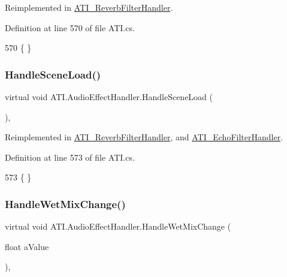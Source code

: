 Reimplemented in \hyperlink{class_a_t_i___reverb_filter_handler_a52fe6f9775f8e51296580f7a96b47bdb}{A\+T\+I\+\_\+\+Reverb\+Filter\+Handler}.



Definition at line 570 of file A\+T\+I.\+cs.


\begin{DoxyCode}
570 \{ \}
\end{DoxyCode}
\mbox{\label{class_a_t_i_1_1_audio_effect_handler_aa038c62089df16a01d2749986649db11}} 
\subsubsection{\texorpdfstring{Handle\+Scene\+Load()}{HandleSceneLoad()}}
{\footnotesize\ttfamily virtual void A\+T\+I.\+Audio\+Effect\+Handler.\+Handle\+Scene\+Load (\begin{DoxyParamCaption}{ }\end{DoxyParamCaption})\hspace{0.3cm}{\ttfamily [protected]}, {\ttfamily [virtual]}}



Reimplemented in \hyperlink{class_a_t_i___reverb_filter_handler_a084dca3566139f350b0372d3ee85af84}{A\+T\+I\+\_\+\+Reverb\+Filter\+Handler}, and \hyperlink{class_a_t_i___echo_filter_handler_aef6df1fd85fb153d232191f1bd4de5f3}{A\+T\+I\+\_\+\+Echo\+Filter\+Handler}.



Definition at line 573 of file A\+T\+I.\+cs.


\begin{DoxyCode}
573 \{ \}
\end{DoxyCode}
\mbox{\label{class_a_t_i_1_1_audio_effect_handler_a630d6f0e674c531ad0c138181609a895}} 
\subsubsection{\texorpdfstring{Handle\+Wet\+Mix\+Change()}{HandleWetMixChange()}}
{\footnotesize\ttfamily virtual void A\+T\+I.\+Audio\+Effect\+Handler.\+Handle\+Wet\+Mix\+Change (\begin{DoxyParamCaption}\item[{float}]{a\+Value }\end{DoxyParamCaption})\hspace{0.3cm}{\ttfamily [protected]}, {\ttfamily [virtual]}}




